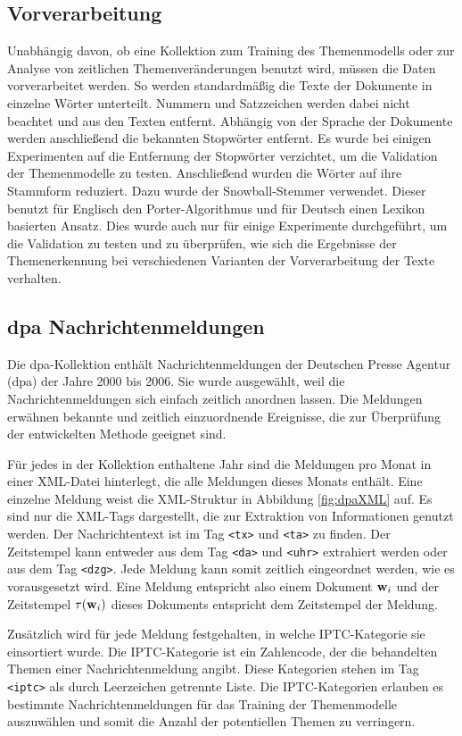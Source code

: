 \subsection{Vorverarbeitung}
Unabhängig davon, ob eine Kollektion zum Training des Themenmodells oder zur Analyse von zeitlichen Themenveränderungen benutzt wird, müssen die Daten vorverarbeitet werden. So werden standardmäßig die Texte der Dokumente in einzelne Wörter unterteilt. Nummern und Satzzeichen werden dabei nicht beachtet und aus den Texten entfernt. Abhängig von der Sprache der Dokumente werden anschließend die bekannten Stopwörter entfernt. Es wurde bei einigen Experimenten auf die Entfernung der Stopwörter verzichtet, um die Validation der Themenmodelle zu testen. Anschließend wurden die Wörter auf ihre Stammform reduziert. Dazu wurde der Snowball-Stemmer \citep{snowballWebsite} verwendet. Dieser benutzt für Englisch den Porter-Algorithmus und für Deutsch einen Lexikon basierten Ansatz. Dies wurde auch nur für einige Experimente durchgeführt, um die Validation zu testen und zu überprüfen, wie sich die Ergebnisse der Themenerkennung bei verschiedenen Varianten der Vorverarbeitung der Texte verhalten. 

\subsection{dpa Nachrichtenmeldungen}
Die dpa-Kollektion enthält Nachrichtenmeldungen der Deutschen Presse Agentur (dpa) der Jahre 2000 bis 2006. Sie wurde ausgewählt, weil die Nachrichtenmeldungen sich einfach zeitlich anordnen lassen. Die Meldungen erwähnen bekannte und zeitlich einzuordnende Ereignisse, die zur Überprüfung der entwickelten Methode geeignet sind.

Für jedes in der Kollektion enthaltene Jahr sind die Meldungen pro Monat in einer XML-Datei hinterlegt, die alle Meldungen dieses Monats enthält. Eine einzelne Meldung weist die XML-Struktur in Abbildung \ref{fig:dpaXML} auf. Es sind nur die XML-Tags dargestellt, die zur Extraktion von Informationen genutzt werden. Der Nachrichtentext ist im Tag \texttt{<tx>} und \texttt{<ta>} zu finden. Der Zeitstempel kann entweder aus dem Tag \texttt{<da>} und \texttt{<uhr>} extrahiert werden oder aus dem Tag \texttt{<dzg>}. Jede Meldung kann somit zeitlich eingeordnet werden, wie es vorausgesetzt wird. Eine Meldung entspricht also einem Dokument $\mathbf{w}_i$ und der Zeitstempel $\tau(\mathbf{w}_i)$ dieses Dokuments entspricht dem Zeitstempel der Meldung.

Zusätzlich wird für jede Meldung festgehalten, in welche IPTC-Kategorie sie einsortiert wurde. Die IPTC-Kategorie ist ein Zahlencode, der die behandelten Themen einer Nachrichtenmeldung angibt. Diese Kategorien stehen im Tag \texttt{<iptc>} als durch Leerzeichen getrennte Liste. Die IPTC-Kategorien erlauben es bestimmte Nachrichtenmeldungen für das Training der Themenmodelle auszuwählen und somit die Anzahl der potentiellen Themen zu verringern. 

